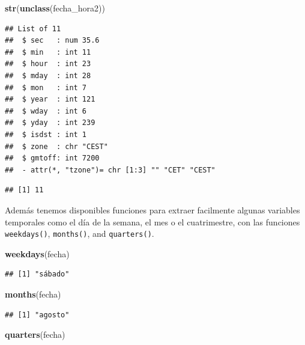 \documentclass[11pt,]{book}
\newenvironment{Shaded}{\begin{snugshade}}{\end{snugshade}}
\newcommand{\CommentTok}[1]{\textcolor[rgb]{0.37,0.37,0.37}{\textit{#1}}}
\newcommand{\KeywordTok}[1]{\textcolor[rgb]{0.27,0.27,0.27}{\textbf{#1}}}
\newcommand{\NormalTok}[1]{#1}
\newcommand{\OperatorTok}[1]{\textcolor[rgb]{0.43,0.43,0.43}{\textbf{#1}}}
\begin{document}
\begin{Shaded}
\begin{Highlighting}[]
\KeywordTok{str}\NormalTok{(}\KeywordTok{unclass}\NormalTok{(fecha_hora2))}
\end{Highlighting}
\end{Shaded}

\begin{verbatim}
## List of 11
##  $ sec   : num 35.6
##  $ min   : int 11
##  $ hour  : int 23
##  $ mday  : int 28
##  $ mon   : int 7
##  $ year  : int 121
##  $ wday  : int 6
##  $ yday  : int 239
##  $ isdst : int 1
##  $ zone  : chr "CEST"
##  $ gmtoff: int 7200
##  - attr(*, "tzone")= chr [1:3] "" "CET" "CEST"
\end{verbatim}

\begin{Shaded}
\end{Shaded}

\begin{verbatim}
## [1] 11
\end{verbatim}

Además tenemos disponibles funciones para extraer facilmente algunas variables temporales como el día de la semana, el mes o el cuatrimestre, con las funciones \texttt{weekdays()}, \texttt{months()}, and \texttt{quarters()}.

\begin{Shaded}
\begin{Highlighting}[]
\KeywordTok{weekdays}\NormalTok{(fecha)}
\end{Highlighting}
\end{Shaded}

\begin{verbatim}
## [1] "sábado"
\end{verbatim}

\begin{Shaded}
\begin{Highlighting}[]
\KeywordTok{months}\NormalTok{(fecha)}
\end{Highlighting}
\end{Shaded}

\begin{verbatim}
## [1] "agosto"
\end{verbatim}

\begin{Shaded}
\begin{Highlighting}[]
\KeywordTok{quarters}\NormalTok{(fecha)}
\end{Highlighting}
\end{Shaded}
\end{document}
